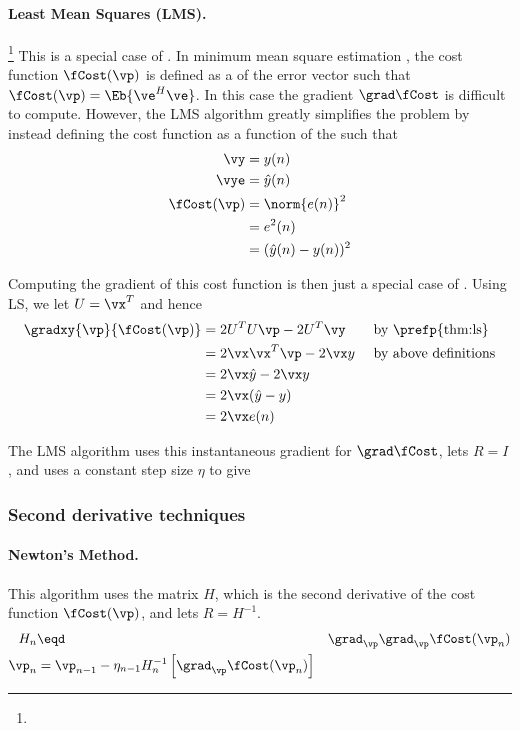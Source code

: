 \paragraph{Least Mean Squares (LMS).}\footnote{}
This is a special case of .
In minimum mean square estimation ,
the cost function $\fCost(\vp)$ is defined as a
 of the error vector such that
$\fCost(\vp) = \Eb{\ve^H\ve}$.
In this case the gradient $\grad\fCost$ is difficult to compute.
However, the LMS algorithm greatly simplifies the problem by
instead defining the cost function as a function of the
 such that
\begin{align*}
   \vy &= y(n)
\\
   \vye &= \hat{y}(n)
\\
   \fCost(\vp)
   &= \norm{e(n)}^2
 \\&= e^2(n)
 \\&= (\hat{y}(n)-y(n))^2
\end{align*}

Computing the gradient of this cost function is then
just a special case of  .
Using LS, we let $U=\vx^T$ and hence
\begin{align*}
   \gradxy{\vp}{\fCost(\vp)}
   &= 2U^TU \vp -2U^T\vy                   && \text{ by \prefp{thm:ls}}
\\ &= 2\vx\vx^T \vp -2\vx y               && \text{ by above definitions}
\\ &= 2\vx\hat{y} -2\vx y                    && \text{ }
\\ &= 2\vx(\hat{y} -y)                      && \text{ }
\\ &= 2\vx e(n)                && \text{ }
\end{align*}

The LMS algorithm uses this instantaneous gradient for $\grad\fCost$,
lets $R=I$, and uses a constant step size $\eta$ to give
\subsubsection*{Second derivative techniques}
\paragraph{Newton's Method.}
This algorithm uses the  matrix $H$,
which is the second derivative of the cost function $\fCost(\vp)$,
and lets $R=H^{-1}$.
\begin{align*}
   H_n &\eqd& \grad_\vp\grad_\vp \fCost(\vp_n)
\\
   \vp_n &= \vp_{n-1} - \eta_{n-1} H_n^{-1} \left[\grad_\vp\fCost(\vp_n)\right]
\end{align*}


